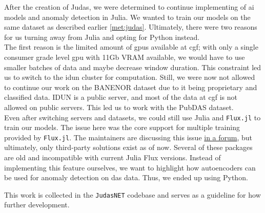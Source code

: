 After the creation of Judas, we were determined to continue implementing of \acrshort{ai} models and anomaly detection in Julia. We wanted to train our models on the same dataset as described earlier \ref{met:judas}. Ultimately, there were two reasons for us turning away from Julia and opting for Python instead. \\
The first reason is the limited amount of \acrshort{gpu}s available at \acrshort{cgf}; with only a single consumer grade level \acrshort{gpu} with 11Gb VRAM available, we would have to use smaller batches of data and maybe decrease window duration. This constraint led us to switch to the \gls{idun} cluster for computation. Still, we were now not allowed to continue our work on the BANENOR dataset due to it being proprietary and classified data. IDUN is a public server, and most of the data at \acrshort{cgf} is not allowed on public servers. This led us to work with the PubDAS dataset. \\
Even after switching servers and datasets, we could still use Julia and \texttt{Flux.jl} to train our models. The issue here was the core support for multiple training provided by \texttt{Flux.jl}. The maintainers are discussing this issue \href{https://github.com/FluxML/Flux.jl/issues/1829}{in a forum}, but ultimately, only third-party solutions exist as of now. Several of these packages are old and incompatible with current Julia Flux versions. Instead of implementing this feature ourselves, we want to highlight how autoencoders can be used for anomaly detection on \acrshort{das} data. Thus, we ended up using Python. 

This work is collected in the \texttt{JudasNET} codebase and serves as a guideline for how further development.